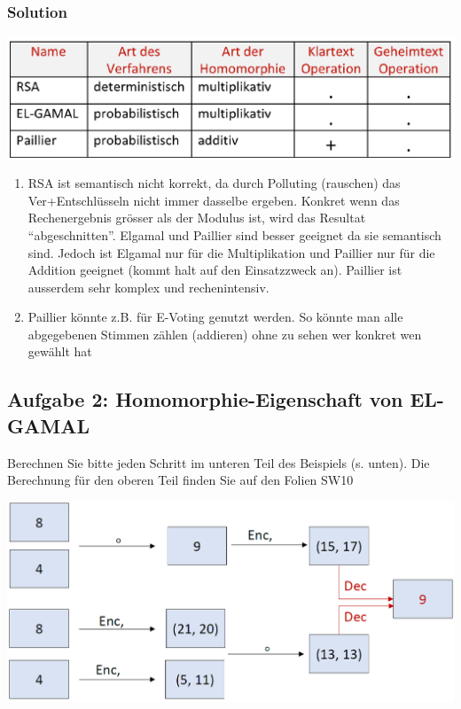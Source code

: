 \documentclass[11pt]{article}
\begin{document}
\hypertarget{solution}{%
\subsubsection{Solution}\label{solution}}

\begin{center}
	\includegraphics[scale=0.6]{img/algoverview.png}
\end{center}

\begin{enumerate}
\def\labelenumi{\arabic{enumi}.}
\item
  RSA ist semantisch nicht korrekt, da durch Polluting (rauschen) das
  Ver+Entschlüsseln nicht immer dasselbe ergeben. Konkret wenn das
  Rechenergebnis grösser als der Modulus ist, wird das Resultat
  ``abgeschnitten''. Elgamal und Paillier sind besser geeignet da sie
  semantisch sind. Jedoch ist Elgamal nur für die Multiplikation und
  Paillier nur für die Addition geeignet (kommt halt auf den
  Einsatzzweck an). Paillier ist ausserdem sehr komplex und
  rechenintensiv.
\item
  Paillier könnte z.B. für E-Voting genutzt werden. So könnte man alle
  abgegebenen Stimmen zählen (addieren) ohne zu sehen wer konkret wen
  gewählt hat
\end{enumerate}

    \hypertarget{aufgabe-2-homomorphie-eigenschaft-von-el-gamal}{%
\subsection{Aufgabe 2: Homomorphie-Eigenschaft von
EL-GAMAL}\label{aufgabe-2-homomorphie-eigenschaft-von-el-gamal}}

Berechnen Sie bitte jeden Schritt im unteren Teil des Beispiels (s.
unten). Die Berechnung für den oberen Teil finden Sie auf den Folien
SW10

\begin{center}
	\includegraphics[scale=0.6]{img/elgamal.png}
\end{center}
\end{document}

